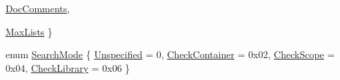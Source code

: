\begin{CompactItemize}
\hyperlink{classvjassdoc_1_1Parser_4ef39527519272daf05a22b5276062ad265d1dc84ec8fb1cdc541c4c7dcf7703}{DocComments}, 
\par
\hyperlink{classvjassdoc_1_1Parser_4ef39527519272daf05a22b5276062ade3e17f5c38af8daca5a9c630a94b1d0e}{MaxLists}
 \}
\item 
enum \hyperlink{classvjassdoc_1_1Parser_ed659a05a08c7db4e2d233d133efdfda}{SearchMode} \{ \hyperlink{classvjassdoc_1_1Parser_ed659a05a08c7db4e2d233d133efdfda0c7d1429795d173910a45b9802e85a78}{Unspecified} =  0, 
\hyperlink{classvjassdoc_1_1Parser_ed659a05a08c7db4e2d233d133efdfda7a3cb4c281b5963124fd9a343e1291fd}{CheckContainer} =  0x02, 
\hyperlink{classvjassdoc_1_1Parser_ed659a05a08c7db4e2d233d133efdfda5f08408bf6bce944fee8102db9491502}{CheckScope} =  0x04, 
\hyperlink{classvjassdoc_1_1Parser_ed659a05a08c7db4e2d233d133efdfda2bab4e7a1ac331dbfd1726e4d06ae725}{CheckLibrary} =  0x06
 \}
\end{CompactItemize}
